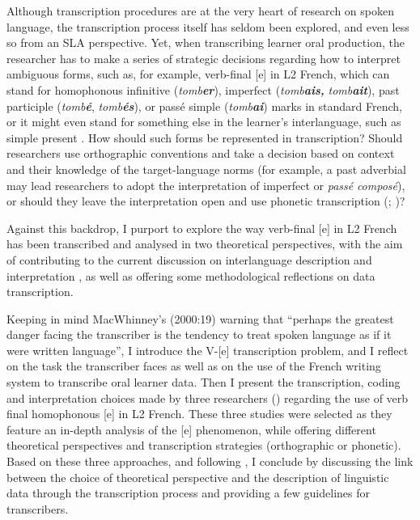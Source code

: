 \documentclass[output=paper,colorlinks,citecolor=brown,modfonts,nonflat]{../langscibook}
\begin{document}
Although transcription procedures are at the very heart of research on spoken language, the transcription process itself has seldom been explored, and even less so from an SLA perspective. Yet, when transcribing learner oral production, the researcher has to make a series of strategic decisions regarding how to interpret ambiguous forms, such as, for example, verb-final [e] in L2 French, which can stand for homophonous infinitive (\textit{tomb}\textbf{\textit{er}}), imperfect (\textit{tomb}\textbf{\textit{ais,} }\textit{tomb}\textbf{\textit{ait}}), past participle (\textit{tomb}\textbf{\textit{é}},\textbf{ }\textit{tomb}\textbf{\textit{és}}), or passé simple (\textit{tomb}\textbf{\textit{ai}}) marks in standard French, or it might even stand for something else in the learner’s interlanguage, such as simple present \citep{Granget2015}. How should such forms be represented in transcription? Should  researchers use orthographic conventions and take a decision based on context and their knowledge of the target-language norms (for example, a past adverbial may lead researchers to adopt the interpretation of imperfect or \textit{passé} \textit{composé}), or should they leave the interpretation open and use phonetic transcription (\citealt[19]{MacWhinney2000}; \citealt{Saturno2015})? 

Against this backdrop, I purport to explore the way verb-final [e] in L2 French has been transcribed and analysed in two theoretical perspectives, with the aim of contributing to the current discussion on interlanguage description and interpretation \citep{Ortega2014trying}, as well as offering some methodological reflections on data transcription.

Keeping in mind MacWhinney’s (2000:19) warning that “perhaps the greatest danger facing the transcriber is the tendency to treat spoken language as if it were written language”, I introduce the V-[e] transcription problem, and I reflect on the task the transcriber faces as well as on the use of the French writing system to transcribe oral learner data. Then I present the transcription, coding and interpretation choices made by three researchers (\citealt{Herschensohn2001,Prévost2007French, Prévost2007English,Granget2015}) regarding the use of verb final homophonous [e] in L2 French. These three studies were selected as they feature an in-depth analysis of the [e] phenomenon, while offering different theoretical perspectives and transcription strategies (orthographic or phonetic). Based on these three approaches, and following \citet{Ortega2014trying}, I conclude by discussing the link between the choice of theoretical perspective and the description of linguistic data through the transcription process and providing a few guidelines for transcribers.
\end{document}
